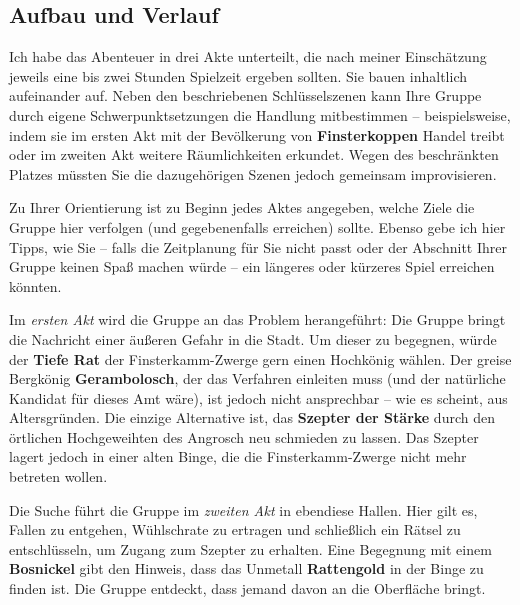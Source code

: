 \subsection{Aufbau und Verlauf}
Ich habe das Abenteuer in drei Akte unterteilt, die nach meiner Einschätzung jeweils eine bis zwei Stunden Spielzeit ergeben sollten.
Sie bauen inhaltlich aufeinander auf.
Neben den beschriebenen Schlüsselszenen kann Ihre Gruppe durch eigene Schwerpunktsetzungen die Handlung mitbestimmen -- beispielsweise,
indem sie im ersten Akt mit der Bevölkerung von \textbf{Finsterkoppen} Handel treibt oder im zweiten Akt weitere Räumlichkeiten erkundet.
Wegen des beschränkten Platzes müssten Sie die dazugehörigen Szenen jedoch gemeinsam improvisieren.

Zu Ihrer Orientierung ist zu Beginn jedes Aktes angegeben, welche Ziele die Gruppe hier verfolgen (und gegebenenfalls erreichen) sollte.
Ebenso gebe ich hier Tipps, wie Sie -- falls die Zeitplanung für Sie nicht passt  oder der Abschnitt Ihrer Gruppe keinen Spaß machen würde -- ein längeres oder kürzeres Spiel erreichen könnten.

Im \emph{ersten Akt} wird die Gruppe an das Problem herangeführt:
Die Gruppe bringt die Nachricht einer äußeren Gefahr in die Stadt.
Um dieser zu begegnen, würde der \textbf{Tiefe Rat} der Finsterkamm-Zwerge gern einen Hochkönig wählen.
Der greise Bergkönig \textbf{Gerambolosch}, der das Verfahren einleiten muss (und der natürliche Kandidat für dieses Amt wäre), ist jedoch nicht ansprechbar -- wie es scheint, aus Altersgründen.
Die einzige Alternative ist, das \textbf{Szepter der Stärke} durch den örtlichen Hochgeweihten des Angrosch neu schmieden zu lassen.
Das Szepter lagert jedoch in einer alten Binge, die die Finsterkamm-Zwerge nicht mehr betreten wollen.


Die Suche führt die Gruppe im \emph{zweiten Akt} in ebendiese Hallen.
Hier gilt es, Fallen zu entgehen, Wühlschrate zu ertragen und schließlich ein Rätsel zu entschlüsseln, um Zugang zum Szepter zu erhalten.
Eine Begegnung mit einem \textbf{Bosnickel} gibt den Hinweis, dass das Unmetall \textbf{Rattengold} in der Binge zu finden ist.
Die Gruppe entdeckt, dass jemand davon an die Oberfläche bringt.

